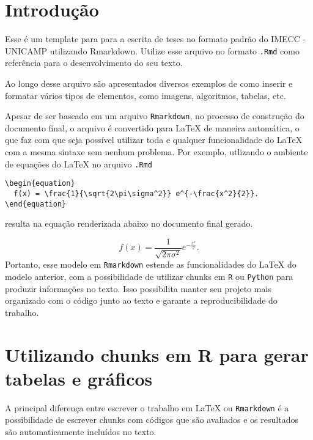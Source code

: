 \documentclass[
	oldfontcommands,
	sumario=abnt-6027-2012,
	12pt,
	openright,
	oneside,
	a4paper,
	english,
	english
	]{imecc-unicamp}
\begin{document}
\tableofcontents*
\cleardoublepage

\textual

\chapter*[Introdução]{Introdução}

Esse é um template para para a escrita de teses no formato padrão do
IMECC - UNICAMP utilizando Rmarkdown. Utilize esse arquivo no formato
\texttt{.Rmd} como referência para o desenvolvimento do seu texto.

Ao longo desse arquivo são apresentados diversos exemplos de como
inserir e formatar vários tipos de elementos, como imagens, algoritmos,
tabelas, etc.

Apesar de ser baseado em um arquivo \texttt{Rmarkdown}, no processo de
construção do documento final, o arquivo é convertido para LaTeX de
maneira automática, o que faz com que seja possível utilizar toda e
qualquer funcionalidade do LaTeX com a mesma sintaxe sem nenhum
problema. Por exemplo, utlizando o ambiente de equações do LaTeX no
arquivo \texttt{.Rmd}

\begin{verbatim} 
\begin{equation}
  f(x) = \frac{1}{\sqrt{2\pi\sigma^2}} e^{-\frac{x^2}{2}}.
\end{equation}
\end{verbatim}

resulta na equação renderizada abaixo no documento final gerado.

\begin{equation}
  f(x) = \frac{1}{\sqrt{2\pi\sigma^2}} e^{-\frac{x^2}{2}}.
\end{equation} Portanto, esse modelo em \texttt{Rmarkdown} estende as
funcionalidades do LaTeX do modelo anterior, com a possibilidade de
utilizar chunks em \texttt{R} ou \texttt{Python} para produzir
informações no texto. Isso possibilita manter seu projeto mais
organizado com o código junto ao texto e garante a reproducibilidade do
trabalho.

\chapter{Utilizando chunks em R para gerar tabelas e gráficos}

A principal diferença entre escrever o trabalho em LaTeX ou
\texttt{Rmarkdown} é a possibilidade de escrever chunks com códigos que
são avaliados e os resultados são automaticamente incluídos no texto.
\end{document}

